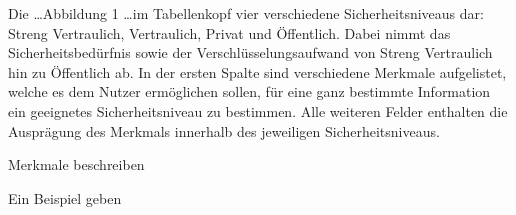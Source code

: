 
Die \dots Abbildung 1 \dots im Tabellenkopf vier verschiedene Sicherheitsniveaus dar: Streng Vertraulich, Vertraulich, Privat und Öffentlich. Dabei nimmt das Sicherheitsbedürfnis sowie der Verschlüsselungsaufwand von Streng Vertraulich hin zu Öffentlich ab.
In der ersten Spalte sind verschiedene Merkmale aufgelistet, welche es dem Nutzer ermöglichen sollen, für eine ganz bestimmte Information ein geeignetes Sicherheitsniveau zu bestimmen.
Alle weiteren Felder enthalten die Ausprägung des Merkmals innerhalb des jeweiligen Sicherheitsniveaus.


Merkmale beschreiben

Ein Beispiel geben

